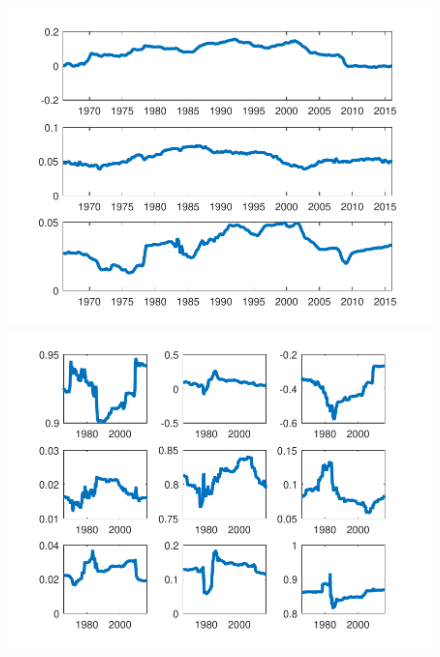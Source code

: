 \documentclass[12pt,reqno]{article}
\numberwithin{equation}{section}
\begin{document}
\begin{figure}[H]
\includegraphics[scale=0.6]{NKPC_filter_init_VAR1_alphas.pdf}
\includegraphics[scale=0.6]{NKPC_filter_init_VAR1_betas.pdf}


\end{figure}

\newpage
\end{document}
